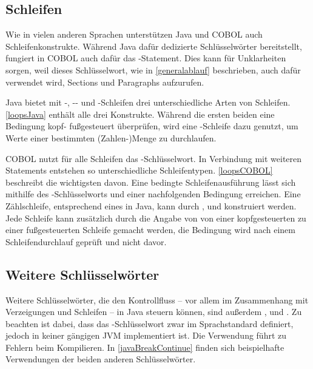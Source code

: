 \subsection{Schleifen}

Wie in vielen anderen Sprachen unterstützen Java und COBOL auch Schleifenkonstrukte. Während Java dafür dedizierte Schlüsselwörter bereitstellt, fungiert in COBOL auch dafür das -Statement. Dies kann für Unklarheiten sorgen, weil dieses Schlüsselwort, wie in \autoref{generalablauf} beschrieben, auch dafür verwendet wird, Sections und Paragraphs aufzurufen.

Java bietet mit -, -- und -Schleifen drei unterschiedliche Arten von Schleifen. \autoref{loopsJava} enthält alle drei Konstrukte. Während die ersten beiden eine Bedingung kopf- \bzw fußgesteuert überprüfen, wird eine -Schleife \idR dazu genutzt, um Werte einer bestimmten (Zahlen-)Menge zu durchlaufen.


COBOL nutzt für alle Schleifen das -Schlüsselwort. In Verbindung mit weiteren Statements entstehen so unterschiedliche Schleifentypen. \autoref{loopsCOBOL} beschreibt die wichtigsten davon. Eine bedingte Schleifenausführung lässt sich mithilfe des -Schlüsselworts und einer nachfolgenden Bedingung erreichen. Eine Zählschleife, entsprechend eines  in Java, kann durch ,  und  konstruiert werden. Jede Schleife kann zusätzlich durch die Angabe von  von einer kopfgesteuerten zu einer fußgesteuerten Schleife gemacht werden, \dahe die Bedingung wird nach einem Schleifendurchlauf geprüft und nicht davor.


\subsection{Weitere Schlüsselwörter}

Weitere Schlüsselwörter, die den Kontrollfluss -- vor allem im Zusammenhang mit Verzeigungen und Schleifen -- in Java steuern können, sind außerdem ,  und . Zu beachten ist dabei, dass das -Schlüsselwort zwar im Sprachstandard definiert, jedoch in keiner gängigen JVM implementiert ist. Die Verwendung führt zu Fehlern beim Kompilieren. In \autoref{javaBreakContinue} finden sich beispielhafte Verwendungen der beiden anderen Schlüsselwörter.

